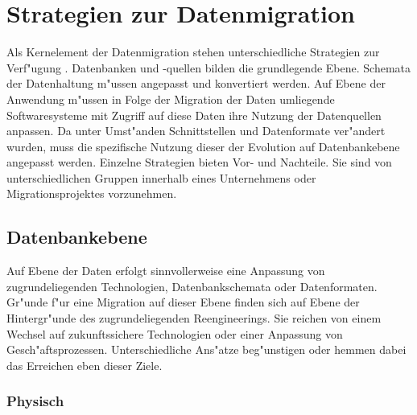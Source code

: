 \section{Strategien zur Datenmigration}
\label{chapter:strategien}

Als Kernelement der Datenmigration stehen unterschiedliche Strategien zur Verf"ugung \citep{henrard-2002}. Datenbanken und -quellen bilden die grundlegende Ebene. Schemata der Datenhaltung m"ussen angepasst und konvertiert werden. Auf Ebene der Anwendung m"ussen in Folge der Migration der Daten umliegende Softwaresysteme mit Zugriff auf diese Daten ihre Nutzung der Datenquellen anpassen. Da unter Umst"anden Schnittstellen und Datenformate ver"andert wurden, muss die spezifische Nutzung dieser der Evolution auf Datenbankebene angepasst werden.
\lb
Einzelne Strategien bieten Vor- und Nachteile. Sie sind von unterschiedlichen Gruppen innerhalb eines Unternehmens oder Migrationsprojektes vorzunehmen.


\subsection{Datenbankebene}

Auf Ebene der Daten erfolgt sinnvollerweise eine Anpassung von zugrundeliegenden Technologien, Datenbankschemata oder Datenformaten. Gr"unde f"ur eine Migration auf dieser Ebene finden sich auf Ebene der Hintergr"unde des zugrundeliegenden Reengineerings. Sie reichen von einem Wechsel auf zukunftssichere Technologien oder einer Anpassung von Gesch"aftsprozessen. Unterschiedliche Ans"atze beg"unstigen oder hemmen dabei das Erreichen eben dieser Ziele. 

\subsubsection{Physisch}

